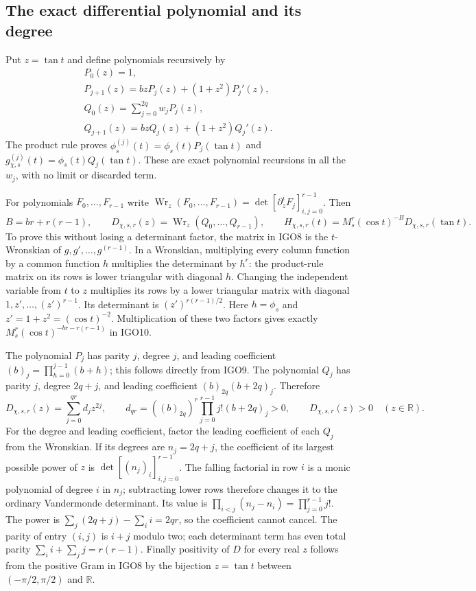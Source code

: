\documentclass[11pt,a4paper]{article}
\begin{document}
\subsection{The exact differential polynomial and its degree}
Put $z=\tan t$ and define polynomials recursively by
\[
 \begin{gathered}
 P_0(z)=1,\\
 P_{j+1}(z)=bzP_j(z)+(1+z^2)P_j'(z),\\
 Q_0(z)=\sum_{j=0}^{2q}w_jP_j(z),\\
 Q_{j+1}(z)=bzQ_j(z)+(1+z^2)Q_j'(z).
 \end{gathered}
 \tag{IGO9}
\]
The product rule proves
$\phi_s^{(j)}(t)=\phi_s(t)P_j(\tan t)$ and
$g_{\chi,s}^{(j)}(t)=\phi_s(t)Q_j(\tan t)$.
These are exact polynomial recursions in all the $w_j$, with no
limit or discarded term.

For polynomials $F_0,\ldots,F_{r-1}$ write
$\operatorname{Wr}_z(F_0,\ldots,F_{r-1})
=\det[\partial_z^iF_j]_{i,j=0}^{r-1}$. Then
\[
 B=br+r(r-1),\qquad
 D_{\chi,s,r}(z)=\operatorname{Wr}_z(Q_0,\ldots,Q_{r-1}),
 \qquad
 H_{\chi,s,r}(t)=M_s^r(\cos t)^{-B}D_{\chi,s,r}(\tan t).
 \tag{IGO10}
\]
To prove this without losing a determinant factor, the matrix in
IGO8 is the $t$-Wronskian of $g,g',\ldots,g^{(r-1)}$.
In a Wronskian, multiplying every column function by a common
function $h$ multiplies the determinant by $h^r$:
the product-rule matrix on its rows is lower triangular with
diagonal $h$. Changing the independent variable from $t$ to $z$
multiplies its rows by a lower triangular matrix with diagonal
$1,z',\ldots,(z')^{r-1}$. Its determinant is
$(z')^{r(r-1)/2}$. Here $h=\phi_s$ and
$z'=1+z^2=(\cos t)^{-2}$. Multiplication of these two factors
gives exactly $M_s^r(\cos t)^{-br-r(r-1)}$ in IGO10.

The polynomial $P_j$ has parity $j$, degree $j$, and leading
coefficient $(b)_j=\prod_{h=0}^{j-1}(b+h)$; this follows directly
from IGO9. The polynomial $Q_j$ has parity $j$, degree $2q+j$,
and leading coefficient $(b)_{2q}(b+2q)_j$. Therefore
\[
 D_{\chi,s,r}(z)=\sum_{j=0}^{qr}d_jz^{2j},\qquad
 d_{qr}=((b)_{2q})^r
             \prod_{j=0}^{r-1}j!(b+2q)_j>0,
 \qquad D_{\chi,s,r}(z)>0\quad(z\in\mathbb R).
 \tag{IGO11}
\]
For the degree and leading coefficient, factor the leading
coefficient of each $Q_j$ from the Wronskian. If its degrees are
$n_j=2q+j$, the coefficient of its largest possible power of $z$
is $\det[(n_j)_{\underline i}]_{i,j=0}^{r-1}$.
The falling factorial in row $i$ is a monic polynomial of degree
$i$ in $n_j$; subtracting lower rows therefore changes it to the
ordinary Vandermonde determinant. Its value is
$\prod_{i<j}(n_j-n_i)=\prod_{j=0}^{r-1}j!$.
The power is $\sum_j(2q+j)-\sum_i i=2qr$, so the coefficient
cannot cancel. The parity of entry $(i,j)$ is $i+j$ modulo two;
each determinant term has even total parity
$\sum_i i+\sum_j j=r(r-1)$. Finally positivity of $D$ for
every real $z$ follows from the positive Gram in IGO8 by the
bijection $z=\tan t$ between $(-\pi/2,\pi/2)$ and $\mathbb R$.
\end{document}
